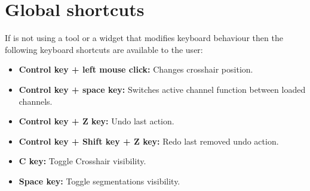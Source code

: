 \section{Global shortcuts}

If \espina{} is not using a tool or a widget that modifies keyboard behaviour then the following keyboard shortcuts are available to the user:
\begin{itemize}
\item \textbf{Control key + left mouse click:} Changes crosshair position.
\item \textbf{Control key + space key:} Switches active channel function between loaded channels.
\item \textbf{Control key + Z key:} Undo last action.
\item \textbf{Control key + Shift key + Z key:} Redo last removed undo action.
\item \textbf{C key:} Toggle Crosshair visibility.
\item \textbf{Space key:} Toggle segmentations visibility.

\end{itemize}
